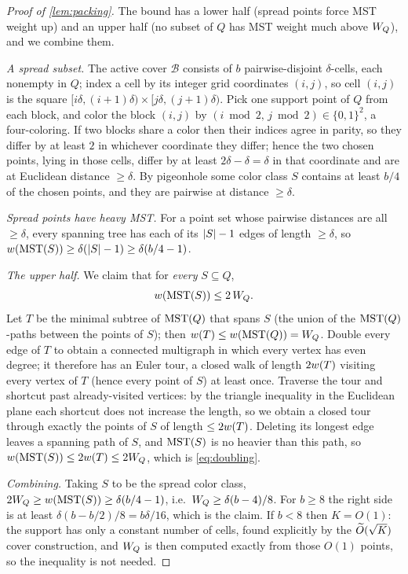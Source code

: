 \begin{proof}[Proof of \cref{lem:packing}]
The bound has a lower half (spread points force MST weight up) and an upper half (no subset of $Q$ has MST
weight much above $W_Q$), and we combine them.

\emph{A spread subset.} The active cover $\mathcal B$ consists of $b$ pairwise-disjoint $\delta$-cells,
each nonempty in $Q$; index a cell by its integer grid coordinates $(i,j)$, so cell $(i,j)$ is the square
$[i\delta,(i{+}1)\delta)\times[j\delta,(j{+}1)\delta)$. Pick one support point of $Q$ from each block, and
color the block $(i,j)$ by $(i\bmod 2,\,j\bmod 2)\in\{0,1\}^2$, a four-coloring. If two blocks share a
color then their indices agree in parity, so they differ by at least $2$ in whichever coordinate they
differ; hence the two chosen points, lying in those cells, differ by at least $2\delta-\delta=\delta$ in
that coordinate and are at Euclidean distance $\ge\delta$. By pigeonhole some color class $S$ contains at
least $b/4$ of the chosen points, and they are pairwise at distance $\ge\delta$.

\emph{Spread points have heavy MST.} For a point set whose pairwise distances are all $\ge\delta$, every
spanning tree has each of its $\left|S\right|-1$ edges of length $\ge\delta$, so $w(\mathrm{MST}(S))\ge\delta(\left|S\right|-1)
\ge\delta(b/4-1)$.

\emph{The upper half.} We claim that for \emph{every} $S\subseteq Q$,
\begin{equation}\label{eq:doubling}
  w(\mathrm{MST}(S))\le 2\,W_Q .
\end{equation}
Let $T$ be the minimal subtree of $\mathrm{MST}(Q)$ that spans $S$ (the union of the $\mathrm{MST}(Q)$-paths between the
points of $S$); then $w(T)\le w(\mathrm{MST}(Q))=W_Q$. Double every edge of $T$ to obtain a connected multigraph
in which every vertex has even degree; it therefore has an Euler tour, a closed walk of length $2w(T)$
visiting every vertex of $T$ (hence every point of $S$) at least once. Traverse the tour and shortcut past
already-visited vertices: by the triangle inequality in the Euclidean plane each shortcut does not
increase the length, so we obtain a closed tour through exactly the points of $S$ of length $\le 2w(T)$.
Deleting its longest edge leaves a spanning path of $S$, and $\mathrm{MST}(S)$ is no heavier than this path, so
$w(\mathrm{MST}(S))\le 2w(T)\le 2W_Q$, which is \eqref{eq:doubling}.

\emph{Combining.} Taking $S$ to be the spread color class, $2W_Q\ge w(\mathrm{MST}(S))\ge\delta(b/4-1)$, i.e.\
$W_Q\ge\delta(b-4)/8$. For $b\ge 8$ the right side is at least $\delta(b-b/2)/8=b\delta/16$, which is the
claim. If $b<8$ then $K=O(1)$: the support has only a constant number of cells, found explicitly by the
$\widetilde{O}(\sqrt K)$ cover construction, and $W_Q$ is then computed exactly from those $O(1)$ points, so the
inequality is not needed.
\end{proof}

